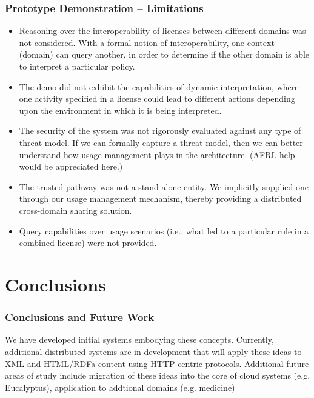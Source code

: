 \documentclass[t,handout, 10pt]{beamer}
\begin{document}
\begin{frame}\frametitle{Prototype Demonstration -- Limitations}
{\small
\begin{itemize}
\item Reasoning over the interoperability of licenses between different domains was not considered. With a formal notion of interoperability, one context (domain) can query another, in order to determine if the other domain is able to interpret a particular policy.
\pause
\item The demo did not exhibit the capabilities of dynamic interpretation, where one activity specified in a license could lead to different actions depending upon the environment in which it is being interpreted.
\pause
\item The security of the system was not rigorously evaluated against any type of threat model. If we can formally capture a threat model, then we can better understand how usage management plays in the architecture. (AFRL help would be appreciated here.)
\pause
\item The trusted pathway was not a stand-alone entity. We implicitly supplied one through our usage management mechanism, thereby providing a distributed cross-domain sharing solution.
\pause
\item Query capabilities over usage scenarios (i.e., what led to a particular rule in a combined license) were not provided.
\end{itemize}}
\end{frame}


\section{Conclusions}

\begin{frame}
\frametitle{Conclusions and Future Work}
We have developed initial systems embodying these concepts.
\newline
\newline
\pause
Currently, additional distributed systems are in development that will apply these ideas to XML and HTML/RDFa content using HTTP-centric protocols.
\newline
\newline
\pause
Additional future areas of study include migration of these ideas into the core of cloud systems (e.g. Eucalyptus), application to addtional domains (e.g. medicine)
\end{frame}
\end{document}
